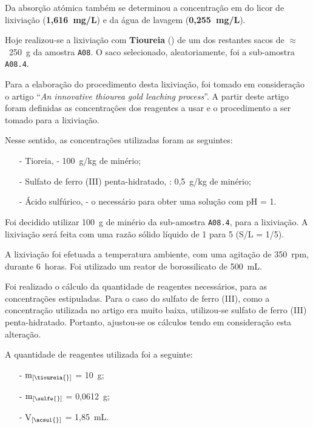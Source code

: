 Da absorção atómica também se determinou a concentração em  do licor de lixiviação (\textbf{1,616~mg/L}) e da água de lavagem (\textbf{0,255~mg/L}).

\hrulefill


\label{day:22-novembro-2024}

Hoje realizou-se a lixiviação com \textbf{Tioureia} (\tioureia{}) de um dos restantes sacos de $\approx$~250~g da amostra \texttt{A08}.
O saco selecionado, aleatoriamente, foi a sub-amostra \texttt{A08.4}.

Para a elaboração do procedimento desta lixiviação, foi tomado em consideração o artigo ``\emph{An innovative thiourea gold leaching process}''\cite{innovative_thiourea_1998}.
A partir deste artigo foram definidas as concentrações dos reagentes a usar e o procedimento a ser tomado para a lixiviação.

Nesse sentido, as concentrações utilizadas foram as seguintes:
\begin{itemize}
    \item[-] Tioreia, \tioureia{} - 100~g/kg de minério;
    \item[-] Sulfato de ferro (III) penta-hidratado, \sulfe{}: 0,5~g/kg de minério;
    \item[-] Ácido sulfúrico, \acsul{} - o necessário para obter uma solução com pH = 1.
\end{itemize}

Foi decidido utilizar 100~g de minério da sub-amostra \texttt{A08.4}, para a lixiviação. 
A lixiviação será feita com uma razão sólido líquido de 1 para 5 (S/L = 1/5).

A lixiviação foi efetuada a temperatura ambiente, com uma agitação de 350~rpm, durante 6~horas.
Foi utilizado um reator de borossilicato de 500~mL.

Foi realizado o cálculo da quantidade de reagentes necessários, para as concentrações estipuladas. 
Para o caso do sulfato de ferro (III), como a concentração utilizada no artigo era muito baixa, utilizou-se sulfato de ferro (III) penta-hidratado. Portanto, ajustou-se os cálculos tendo em consideração esta alteração.

A quantidade de reagentes utilizada foi a seguinte:
\begin{itemize}
    \item[-] $\mathrm{m}_{\left[\tioureia{}\right]}$ = 10~g;
    \item[-] $\mathrm{m}_{\left[\sulfe{}\right]}$ = 0,0612~g;
    \item[-] $\mathrm{V}_{\left[\acsul{}\right]}$ = 1,85~mL.
\end{itemize}

